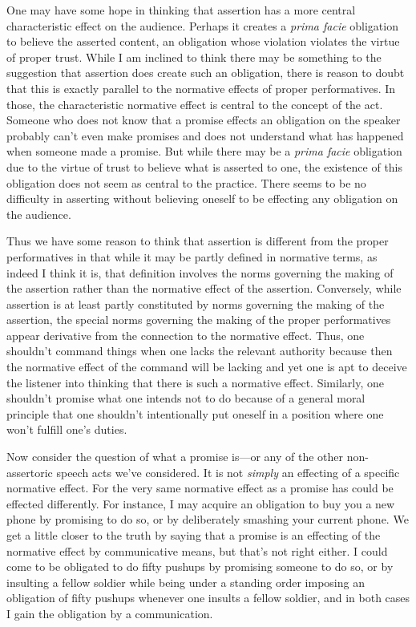 One may have some hope in thinking that assertion has a more central characteristic effect on the audience.
Perhaps it creates a \textit{prima facie} obligation to believe the asserted content, an obligation whose
violation violates the virtue of proper trust. While I am inclined to think there may be something to the
suggestion that assertion does create such an obligation, there is reason to doubt that this is exactly 
parallel to the normative effects of proper performatives. In those, the characteristic normative effect is central to the concept of the
act. Someone who does not know that a promise effects an obligation on the speaker probably can't even 
make promises and does not understand what has happened when someone made a promise.  But while there may 
be a \textit{prima facie} obligation due to the virtue of trust to believe what is asserted to one, the 
existence of this obligation does not seem as central to the practice. There seems to be no difficulty
in asserting without believing oneself to be effecting any obligation on the audience. 

Thus we have some reason to think that assertion is different from the proper performatives in that while 
it may be partly defined in normative terms, as indeed I think it is, that definition 
involves the norms governing the making of the assertion rather than the normative effect of the assertion.
Conversely, while assertion is at least partly constituted by norms governing the making of the assertion,
the special norms governing the making of the proper performatives appear derivative from the connection
to the normative effect. Thus, one shouldn't command things when one lacks the relevant authority because 
then the normative effect of the command will be lacking and yet one is apt to deceive the listener into
thinking that there is such a normative effect. Similarly, one shouldn't promise what one intends not to
do because of a general moral principle that one shouldn't intentionally put oneself in a position where 
one won't fulfill one's duties. 

Now consider the question of what a promise is---or any of the other non-assertoric speech acts we've
considered. It is not \textit{simply} an effecting of a specific normative effect. For the very same
normative effect as a promise has could be effected differently. For instance, I may acquire an obligation
to buy you a new phone by promising to do so, or by deliberately smashing your current phone. We get a 
little closer to the truth by saying that a promise is an effecting of the normative effect by communicative
means, but that's not right either. I could come to be obligated to do fifty pushups by promising someone to do so,
or by insulting a fellow soldier while being under a standing order imposing an obligation of fifty pushups whenever 
one insults a fellow soldier, and in both cases I gain the obligation by a communication.

